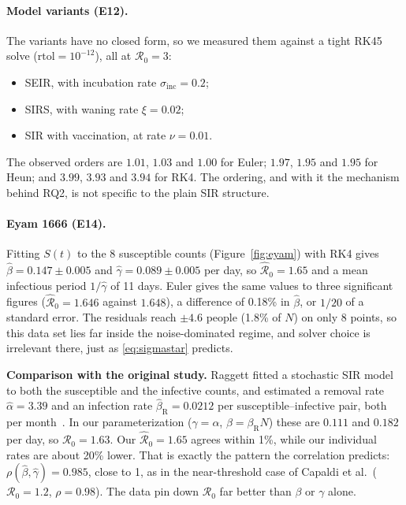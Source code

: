 \documentclass[sigconf]{acmart}
\begin{document}
\paragraph{Model variants (E12).} The variants have no closed form, so
we measured them against a tight RK45 solve ($\text{rtol}=10^{-12}$),
all at $\mathcal R_0=3$:
\begin{itemize}
  \item SEIR, with incubation rate $\sigma_{\mathrm{inc}}=0.2$;
  \item SIRS, with waning rate $\xi=0.02$;
  \item SIR with vaccination, at rate $\nu=0.01$.
\end{itemize}
The observed orders are $1.01$, $1.03$ and $1.00$ for Euler; $1.97$,
$1.95$ and $1.95$ for Heun; and $3.99$, $3.93$ and $3.94$ for RK4. The
ordering, and with it the mechanism behind RQ2, is not specific to the
plain SIR structure.

\paragraph{Eyam 1666 (E14).} Fitting $S(t)$ to the 8 susceptible
counts (Figure~\ref{fig:eyam}) with RK4 gives $\hat\beta=0.147\pm0.005$
and $\hat\gamma=0.089\pm0.005$ per day, so $\hat{\mathcal R}_0=1.65$ and
a mean infectious period $1/\hat\gamma$ of 11 days. Euler gives the same
values to three significant figures ($\hat{\mathcal R}_0=1.646$ against
$1.648$), a difference of 0.18\% in $\hat\beta$, or $1/20$ of a
standard error. The residuals reach $\pm4.6$ people (1.8\% of $N$) on
only 8 points, so this data set lies far inside the noise-dominated
regime, and solver choice is irrelevant there, just as
\eqref{eq:sigmastar} predicts.

\textbf{Comparison with the original study.} Raggett fitted a
stochastic SIR model to both the susceptible and the infective counts,
and estimated a removal rate $\hat\alpha=3.39$ and an infection rate
$\hat\beta_{\mathrm R}=0.0212$ per susceptible--infective pair, both
per month~\cite{raggett1982,ho2017}. In our parameterization
($\gamma=\alpha$, $\beta=\beta_{\mathrm R}N$) these are $0.111$ and
$0.182$ per day, so $\mathcal R_0=1.63$. Our $\hat{\mathcal R}_0=1.65$
agrees within 1\%, while our individual rates are about 20\% lower.
That is exactly the pattern the correlation predicts:
$\rho(\hat\beta,\hat\gamma)=0.985$, close to 1, as in the near-threshold
case of Capaldi et al.\ ($\mathcal R_0=1.2$, $\rho=0.98$). The data pin
down $\mathcal R_0$ far better than $\beta$ or $\gamma$ alone.
\end{document}
